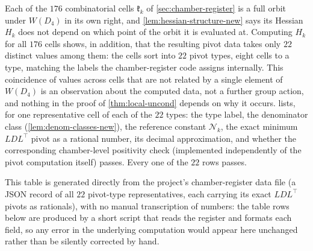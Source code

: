 \documentclass[11pt,reqno]{amsart}
\renewcommand{\_}{\origunderscore\allowbreak}
\numberwithin{equation}{section}
\theoremstyle{plain}
\theoremstyle{definition}
\theoremstyle{remark}
\newcommand{\Cell}[1]{\mathfrak{k}_{#1}}     %
\newcommand{\norm}[1]{\mathcal{N}_{#1}}      %
\begin{document}
Each of the $176$ combinatorial cells $\Cell{k}$ of \cref{sec:chamber-register}
is a full orbit under $W(D_4)$ in its own right, and \cref{lem:hessian-structure-new}
says its Hessian $H_k$ does not depend on which point of the orbit it is
evaluated at. Computing $H_k$ for all $176$ cells shows, in addition, that
the resulting pivot data takes only $22$ distinct values among them: the
cells sort into $22$ pivot types, eight cells to a type, matching the
labels the chamber-register code assigns internally. This coincidence of
values across cells that are not related by a single element of $W(D_4)$
is an observation about the computed data, not a further group action, and
nothing in the proof of \cref{thm:local-uncond} depends on why it occurs.
 lists, for one representative cell of each of the $22$
types: the type label, the denominator class (\cref{lem:denom-classes-new}),
the reference constant $\norm{k}$, the exact minimum $LDL^\top$ pivot as a
rational number, its decimal approximation, and whether the corresponding
chamber-level positivity check (implemented independently of the pivot
computation itself) passes. Every one of the $22$ rows passes.

This table is generated directly from the project's chamber-register
data file (a JSON record of all $22$ pivot-type representatives, each
carrying its exact $LDL^\top$ pivots as rationals), with no manual
transcription of numbers: the table rows below are produced by a short
script that reads the register and formats each field, so any error in
the underlying computation would appear here unchanged rather than be
silently corrected by hand.
\end{document}
